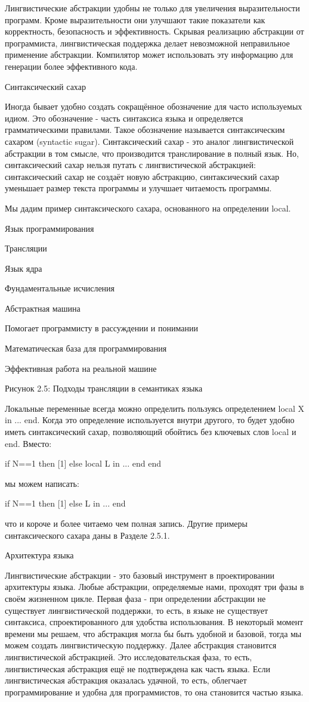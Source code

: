 Лингвистические абстракции удобны не только для увеличения выразительности программ. Кроме выразительности они улучшают такие показатели как корректность, безопасность и эффективность. Скрывая реализацию абстракции от программиста, лингвистическая поддержка делает невозможной неправильное применение абстракции. Компилятор может использовать эту информацию для генерации более эффективного кода.

Синтаксический сахар

Иногда бывает удобно создать сокращённое обозначение для часто используемых идиом. Это обозначение - часть синтаксиса языка и определяется грамматическими правилами. Такое обозначение называется синтаксическим сахаром (syntactic sugar). Синтаксический сахар - это аналог лингвистической абстракции в том смысле, что производится транслирование в полный язык. Но, синтаксический сахар нельзя путать с лингвистической абстракцией: синтаксический сахар не создаёт новую абстракцию, синтаксический сахар уменьшает размер текста программы и улучшает читаемость программы.

Мы дадим пример синтаксического сахара, основанного на определении local.

Язык программирования

Трансляции

Язык ядра

Фундаментальные исчисления

Абстрактная машина

Помогает программисту в рассуждении и понимании

Математическая база для программирования

Эффективная работа на реальной машине

Рисунок 2.5: Подходы трансляции в семантиках языка

Локальные переменные всегда можно определить пользуясь определением local X in ... end. Когда это определение используется внутри другого, то будет удобно иметь синтаксический сахар, позволяющий обойтись без ключевых слов local и end. Вместо:

if N==1 then [1]
else
local L in
...
end
end

мы можем написать:

if N==1 then [1]
else L in
...
end

что и короче и более читаемо чем полная запись. Другие примеры синтаксического сахара даны в Разделе 2.5.1.

Архитектура языка

Лингвистические абстракции - это базовый инструмент в проектировании архитектуры языка. Любые абстракции, определяемые нами, проходят три фазы в своём жизненном цикле. Первая фаза - при определении абстракции не существует лингвистической поддержки, то есть, в языке не существует синтаксиса, спроектированного для удобства использования. В некоторый момент времени мы решаем, что абстракция могла бы быть удобной и базовой, тогда мы можем создать лингвистическую поддержку. Далее абстракция становится лингвистической абстракцией. Это исследовательская фаза, то есть, лингвистическая абстракция ещё не подтверждена как часть языка. Если лингвистическая абстракция оказалась удачной, то есть, облегчает программирование и удобна для программистов, то она становится частью языка.

